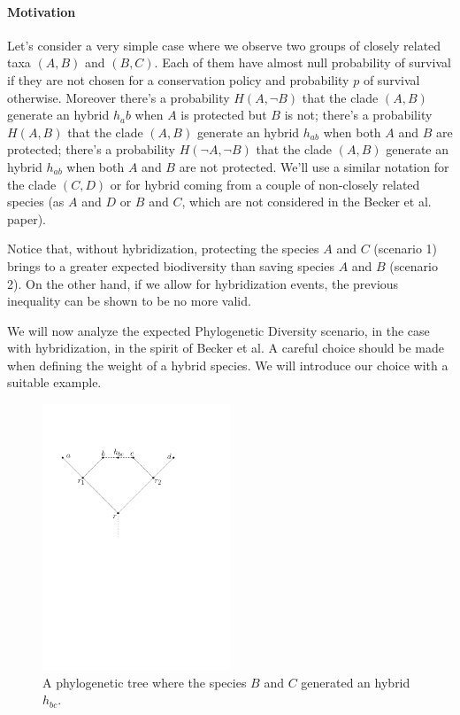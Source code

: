 \documentclass[12pt,a4paper]{report}
\begin{document}
\paragraph{Motivation}

Let's consider a very simple case where we observe two groups of closely related taxa $(A,B)$ and $(B,C)$. Each of them have almost null probability of survival if they are not chosen for a conservation policy and probability $p$ of survival otherwise. Moreover there's a probability $H(A,\neg B)$ that the clade $(A,B)$ generate an hybrid $h_ab$ when $A$ is protected but $B$ is not; there's a probability $H(A,B)$ that the clade $(A,B)$ generate an hybrid $h_{ab}$ when both $A$ and $B$ are protected; there's a probability $H(\neg A, \neg B)$ that the clade $(A,B)$ generate an hybrid $h_{ab}$ when both $A$ and $B$ are not protected. We'll use a similar notation for the clade $(C,D)$ or for hybrid coming from a couple of non-closely related species (as $A$ and $D$ or $B$ and $C$, which are not considered in the Becker et al. paper).

Notice that, without hybridization, protecting the species $A$ and $C$ (scenario 1) brings to a greater expected biodiversity than saving species $A$ and $B$ (scenario 2). On the other hand, if we allow for hybridization events, the previous inequality can be shown to be no more valid.

We will now analyze the expected Phylogenetic Diversity scenario, in the case with hybridization, in the spirit of Becker et al. A careful choice should be made when defining the weight of a hybrid species. We will introduce our choice with a suitable example.

\begin{figure}[ht]
	\centering
		\includegraphics[width=0.5\textwidth]{images/hybridbc}
		\caption{A phylogenetic tree where the species $B$ and $C$ generated an hybrid $h_{bc}$.}
		\label{fig:hybridbc}
\end{figure}
\end{document}
